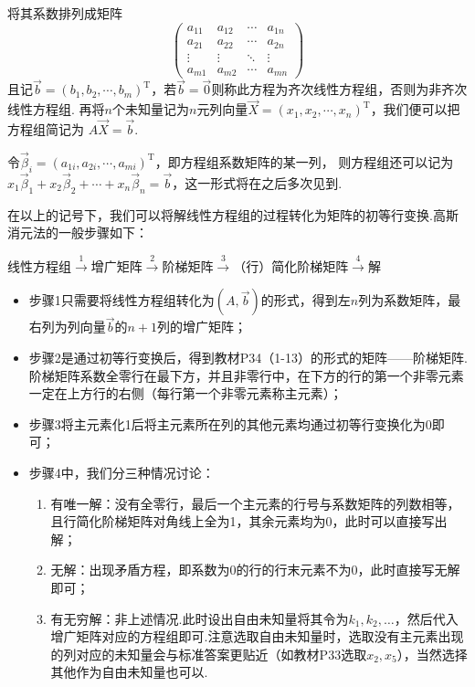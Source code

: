 将其系数排列成矩阵
\[
\begin{pmatrix}
    a_{11} & a_{12} & \cdots & a_{1n} \\
    a_{21} & a_{22} & \cdots & a_{2n} \\
    \vdots & \vdots & \ddots & \vdots \\
    a_{m1} & a_{m2} & \cdots & a_{mn}
\end{pmatrix}
\]
且记$\vec{b}=(b_1,b_2,\cdots,b_m)^\mathrm{T}$，若$\vec{b}=\vec{0}$则称此方程为齐次线性方程组，否则为非齐次线性方程组.
再将$n$个未知量记为$n$元列向量$\vec{X}=(x_1,x_2,\cdots,x_n)^\mathrm{T}$，我们便可以把方程组简记为
$A\vec{X}=\vec{b}$.

令$\vec{\beta}_i=(a_{1i},a_{2i},\cdots,a_{mi})^\mathrm{T}$，即方程组系数矩阵的某一列，
则方程组还可以记为$x_1\vec{\beta}_1+x_2\vec{\beta}_2+\cdots+x_n\vec{\beta}_n=\vec{b}$，这一形式将在之后多次见到.

在以上的记号下，我们可以将解线性方程组的过程转化为矩阵的初等行变换.高斯消元法的一般步骤如下：

\centerline{线性方程组$\overset{1}{\longrightarrow}$增广矩阵$\overset{2}{\longrightarrow}$阶梯矩阵$\overset{3}{\longrightarrow}$（行）简化阶梯矩阵$\overset{4}{\longrightarrow}$解}

\begin{itemize}
    \item 步骤1只需要将线性方程组转化为$(A, \vec{b})$的形式，得到左$n$列为系数矩阵，最右列为列向量$\vec{b}$的$n+1$列的增广矩阵；
    \item 步骤2是通过初等行变换后，得到教材P34（1-13）的形式的矩阵——阶梯矩阵.阶梯矩阵系数全零行在最下方，并且非零行中，在下方的行的第一个非零元素一定在上方行的右侧（每行第一个非零元素称主元素）；
    \item 步骤3将主元素化1后将主元素所在列的其他元素均通过初等行变换化为0即可；
    \item 步骤4中，我们分三种情况讨论：
    \begin{enumerate}
        \item 有唯一解：没有全零行，最后一个主元素的行号与系数矩阵的列数相等，且行简化阶梯矩阵对角线上全为1，其余元素均为0，此时可以直接写出解；
        \item 无解：出现矛盾方程，即系数为0的行的行末元素不为0，此时直接写无解即可；
        \item 有无穷解：非上述情况.此时设出自由未知量将其令为$k_1,k_2,\ldots$，然后代入增广矩阵对应的方程组即可.注意选取自由未知量时，选取没有主元素出现的列对应的未知量会与标准答案更贴近（如教材P33选取$x_2,x_5$），当然选择其他作为自由未知量也可以.
    \end{enumerate}
\end{itemize}

